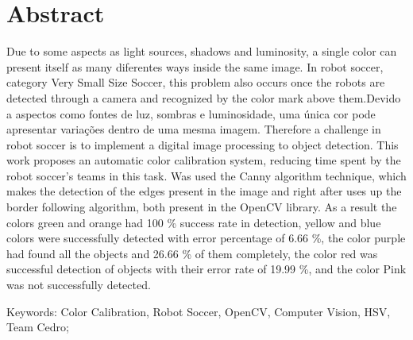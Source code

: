 
\chapter*{Abstract}

Due to some aspects as light sources, shadows and luminosity, a single color can present itself as many diferentes ways inside the same image. In robot soccer, category Very Small Size Soccer, this problem also occurs once the robots are detected through a camera and recognized by the color mark above them.Devido a aspectos como fontes de luz, sombras e luminosidade, uma única cor pode apresentar variações dentro de uma mesma imagem. Therefore a challenge in robot soccer is to implement a digital image processing to object detection. This work proposes an automatic color calibration system, reducing time spent by the robot soccer's teams in this task. Was used the Canny algorithm technique, which makes the detection of the edges present in the image and right after uses up the border following algorithm, both present in the OpenCV library. As a result the colors green and orange had 100 \% success rate in detection, yellow and blue colors were successfully detected with error percentage of 6.66 \%, the color purple had found all the objects and 26.66 \% of them completely, the color red was successful detection of objects with their error rate of 19.99 \%, and the color Pink was not successfully detected.

Keywords: Color Calibration, Robot Soccer, OpenCV, Computer Vision, HSV, Team Cedro;